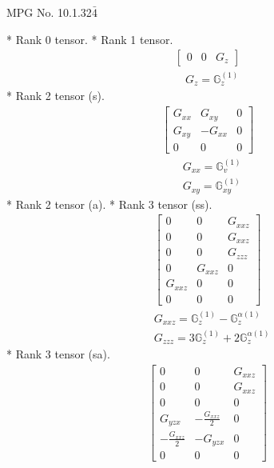 \documentclass[fleqn,8pt,landscape]{jsarticle}
\begin{document}
\setcounter{MaxMatrixCols}{32}

\renewcommand{\tablename}{Table~}
\renewcommand{\figurename}{Figure~}
\begin{center}
\LARGE
MPG No. 10.1.32\quad$\bar{4}$
\end{center}
* Rank 0 tensor.
* Rank 1 tensor.
\begin{align*}
\begin{bmatrix} 0 & 0 & G_{z} \end{bmatrix}
\end{align*}
\begin{align*}
& G_{z} = \mathbb{G}_{z}^{(1)}
\end{align*}
* Rank 2 tensor (s).
\begin{align*}
\begin{bmatrix} G_{xx} & G_{xy} & 0 \\ G_{xy} & - G_{xx} & 0 \\ 0 & 0 & 0 \end{bmatrix}
\end{align*}
\begin{align*}
& G_{xx} = \mathbb{G}_{v}^{(1)} \\
& G_{xy} = \mathbb{G}_{xy}^{(1)}
\end{align*}
* Rank 2 tensor (a).
* Rank 3 tensor (ss).
\begin{align*}
\begin{bmatrix} 0 & 0 & G_{xxz} \\ 0 & 0 & G_{xxz} \\ 0 & 0 & G_{zzz} \\ 0 & G_{xxz} & 0 \\ G_{xxz} & 0 & 0 \\ 0 & 0 & 0 \end{bmatrix}
\end{align*}
\begin{align*}
& G_{xxz} = \mathbb{G}_{z}^{(1)} - \mathbb{G}_{z}^{\alpha(1)} \\
& G_{zzz} = 3 \mathbb{G}_{z}^{(1)} + 2 \mathbb{G}_{z}^{\alpha(1)}
\end{align*}
* Rank 3 tensor (sa).
\begin{align*}
\begin{bmatrix} 0 & 0 & G_{xxz} \\ 0 & 0 & G_{xxz} \\ 0 & 0 & 0 \\ G_{yzx} & - \frac{G_{xxz}}{2} & 0 \\ - \frac{G_{xxz}}{2} & - G_{yzx} & 0 \\ 0 & 0 & 0 \end{bmatrix}
\end{align*}
\end{document}
